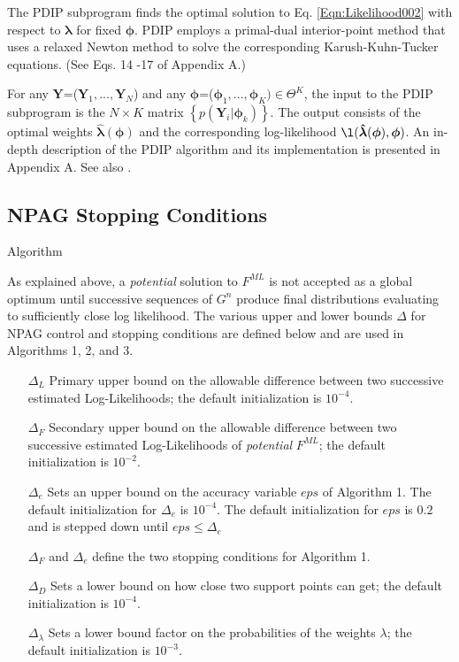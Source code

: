 %
The PDIP subprogram finds the optimal solution to Eq. \ref{Eqn:Likelihood002} with respect to 
$\bm{\lambda}$ for fixed $\bm{\phi}$. 
PDIP  employs a primal-dual interior-point method that uses a relaxed Newton method to solve the corresponding Karush-Kuhn-Tucker equations.
(See Eqs. 14 -17 of Appendix A.)


 For any $\bm{Y}$=($\bm{Y}_1,...,\bm{Y}_N$) and any $\bm{\phi}$=($\bm{\phi}_1,...,\bm{\phi}_K) \in
\Theta^K$, the input to the  PDIP  subprogram is the 
$N \times K$ matrix  $\left\{ p(\bm{Y}_i\vert \bm{\phi}_k)\right\}$. The output consists of the optimal weights $\bm{\hat{\lambda}}(\bm{\phi})$ and the corresponding log-likelihood  $\l(\bm{\hat{\lambda}}(\bm{\phi}),\bm{ \phi}) $.
An in-depth description of the PDIP algorithm and its implementation is presented in Appendix A.
See also \cite{Bell2012b:Online, LAPK-2014-01, Baek2006}.



\subsection{NPAG Stopping Conditions}Algorithm 
\label{SS:Convergence}

As explained above, a {\em potential} solution to $F^{ML}$ is not accepted as a global optimum until successive sequences of $G^n$ produce final distributions evaluating to sufficiently close log likelihood.
The various upper and lower bounds $\Delta$ for NPAG control and stopping conditions are defined below and are used in Algorithms 1, 2,  and 3.
%

\begin{enumerate}

\item [$\Delta_L$] Primary upper bound on the allowable difference between two successive estimated Log-Likelihoods; the default initialization is $10^{-4}$.

\item [$\Delta_F$] Secondary upper bound on the allowable difference between two successive estimated Log-Likelihoods of {\em potential} $F^{ML}$; the default initialization is $10^{-2}$.

\item[$\Delta_e$] Sets an upper bound on the accuracy variable $eps$ of Algorithm 1.   The default initialization for $\Delta_e$ is $10^{-4}$.  The default initialization for $eps$ is $0.2$  and is stepped down until $eps \leq  \Delta_e$

$\Delta_F$ and $\Delta_e$ define the two  stopping conditions for Algorithm 1.

\item [$\Delta_D$] Sets a lower bound on how close two support points can get; the default initialization is $10^{-4}$.

\item[$\Delta_\lambda$] Sets a lower bound factor on the probabilities of the weights $\lambda$; the default initialization is $10^{-3}$.
%

\end{enumerate}


